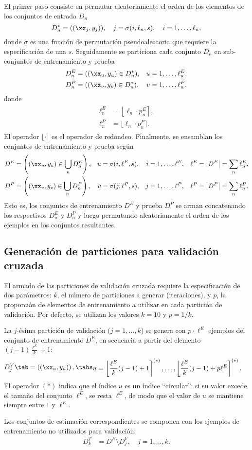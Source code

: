 El primer paso consiste en permutar aleatoriamente el orden de los
elementos de los conjuntos de entrada $D_n$
%
\begin{align}
  D^*_n = ((\xx_j,y_j)), \quad j = \sigma(i,\ell_n,s), \quad i=1,\ldots,\ell_n,
\end{align}
%
donde $\sigma$ es una función de permutación pseudoaleatoria que
requiere la especificación de una  $s$. Seguidamente se
particiona cada conjunto $D_n$ en sub-conjuntos de entrenamiento
y prueba
%
\begin{align}
  D^E_n &= ((\xx_u,y_u)\in D^*_n),& u&=1,\ldots,\ell^E_n, \\
  D^P_n &= ((\xx_v,y_v)\in D^*_n),& v&=1,\ldots,\ell^P_n,
\end{align}
%
donde
%
\begin{align}
  \begin{split}
    \ell^E_n &= \left\lfloor\ell_n\cdot p_n^E \right\rceil, \\
    \ell^P_n &= \lfloor\ell_n\cdot p_n^P\rceil.
  \end{split}
\end{align}
%
El operador $\lfloor\cdot\rceil$ es el operador de redondeo.
Finalmente, se ensamblan los conjuntos de entrenamiento y prueba según
%
\begin{align}
  D^E &= \left( (\xx_u,y_u) \in \bigcup_n {D}^E_n \right), &
  u &= \sigma(i,\ell^E,s), &
  i &= 1,\ldots,\ell^E, &
  \ell^E &= \left| D^E \right| = \sum_n \ell^E_n ,\\
  D^P &= \left( (\xx_v,y_v) \in \bigcup_n {D}^P_n \right), &
  v &= \sigma(j,\ell^P,s), &
  j &= 1,\ldots,\ell^P, &
  \ell^P &= \left| D^P \right| = \sum_n \ell^P_n .
\end{align}
%
Esto es, los conjuntos de entrenamiento $D^E$ y prueba $D^P$ se arman
concatenando los respectivos $D^E_n$ y $D^P_n$ y luego permutando
aleatoriamente el orden de los ejemplos en los conjuntos resultantes.
%
%
\subsection{Generación de particiones para validación cruzada}
%
El armado de las particiones de validación cruzada requiere la
especificación de dos parámetros: $k$, el número de particiones a
generar (iteraciones), y $p$, la proporción de elementos de
entrenamiento a utilizar en cada partición de validación. Por defecto,
se utilizan los valores $k=10$ y $p=1/k$.

La $j$-ésima partición de validación ($j=1,\ldots,k$) se genera con
$p\cdot\ell^E$ ejemplos del conjunto de entrenamiento $D^E$, en
secuencia a partir del elemento $(j-1)\frac{\ell^E}{k}+1$:
%
\begin{align}
  D^V_j \tab= \left((\xx_u,y_u)\right), \tabs
  \begin{split}
    u &= \left\lfloor\frac{\ell^E}{k}(j-1)+1\right\rceil^{(*)},\ldots,
    \left\lfloor\frac{\ell^E}{k}(j-1)+p\ell^E\right\rceil^{(*)}.
  \end{split}
\end{align}
%
El operador $(*)$ indica que el índice $u$ es un índice ``circular'':
si su valor excede el tamaño del conjunto $\ell^E$, se resta $\ell^E$, de
modo que el valor de $u$ se mantiene siempre entre $1$ y $\ell^E$.

Los conjuntos de estimación correspondientes se componen con los
ejemplos de entrenamiento no utilizados para validación:
%
\begin{align}
  D^T_k &= D^E \setminus D^V_j, \quad j=1,\ldots,k.
\end{align}
%
